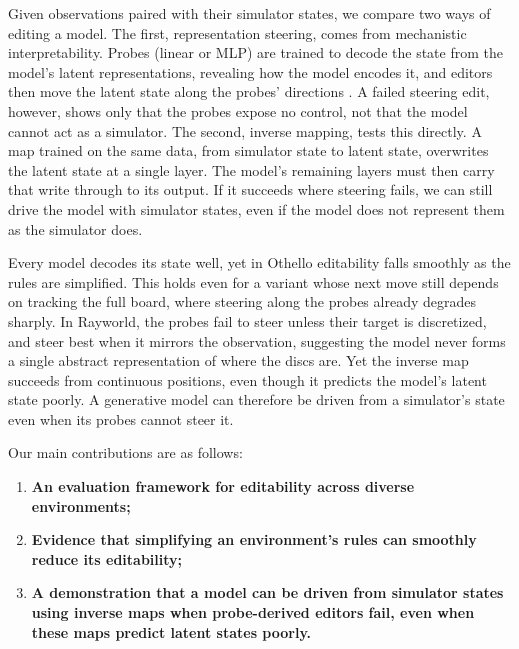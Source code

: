 \documentclass{article} %
\begin{document}
Given observations paired with their simulator states, we compare two ways of editing a model. The first, representation steering, comes from mechanistic interpretability. Probes (linear or MLP) are trained to decode the state from the model's latent representations, revealing how the model encodes it, and editors then move the latent state along the probes' directions \citep{li2023othello,nanda2023linear}. A failed steering edit, however, shows only that the probes expose no control, not that the model cannot act as a simulator. The second, inverse mapping, tests this directly. A map trained on the same data, from simulator state to latent state, overwrites the latent state at a single layer. The model's remaining layers must then carry that write through to its output. If it succeeds where steering fails, we can still drive the model with simulator states, even if the model does not represent them as the simulator does.

Every model decodes its state well, yet in Othello editability falls smoothly as the rules are simplified. This holds even for a variant whose next move still depends on tracking the full board, where steering along the probes already degrades sharply. In Rayworld, the probes fail to steer unless their target is discretized, and steer best when it mirrors the observation, suggesting the model never forms a single abstract representation of where the discs are. Yet the inverse map succeeds from continuous positions, even though it predicts the model's latent state poorly. A generative model can therefore be driven from a simulator's state even when its probes cannot steer it.

Our main contributions are as follows:
\begin{enumerate}[
label=(\arabic*),
leftmargin=*,
align=left,
itemsep=0.25em,
topsep=0pt,
parsep=0pt,
partopsep=0pt
]
\item \textbf{An evaluation framework for editability across diverse environments;}
\item \textbf{Evidence that simplifying an environment's rules can smoothly reduce its editability;}
\item \textbf{A demonstration that a model can be driven from simulator states using inverse maps when probe-derived editors fail, even when these maps predict latent states poorly.}
\end{enumerate}
\end{document}
